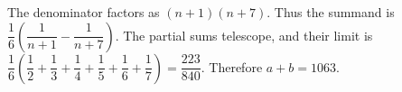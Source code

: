 The denominator factors as $(n+1)(n+7)$. Thus the summand is $\dfrac{1}{6}\left(\dfrac{1}{n+1}-\dfrac{1}{n+7}\right)$. The partial sums telescope, and their limit is $\dfrac{1}{6}\left(\dfrac{1}{2}+\dfrac{1}{3}+\dfrac{1}{4}+\dfrac{1}{5}+\dfrac{1}{6}+\dfrac{1}{7}\right)=\dfrac{223}{840}$. Therefore $\boxed{a+b=1063}$.
